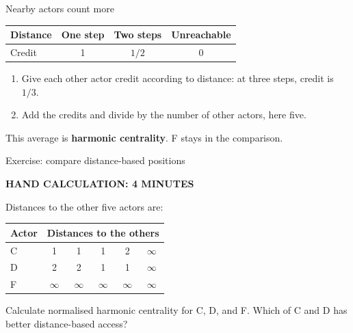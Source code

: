 \documentclass[aspectratio=169,11pt]{beamer}
\newcommand{\activity}[1]{{\small\color{accent}\bfseries #1}\par\medskip}
\begin{document}
\begin{frame}{Nearby actors count more}

\begin{center}
\begin{tabular}{lccc}
\toprule
Distance & One step & Two steps & Unreachable\\\midrule
Credit & 1 & $1/2$ & 0\\\bottomrule
\end{tabular}
\end{center}
\begin{enumerate}
\item Give each other actor credit according to distance: at three steps, credit is $1/3$.
\item Add the credits and divide by the number of other actors, here five.
\end{enumerate}
This average is \textbf{harmonic centrality}. F stays in the comparison.

\end{frame}

\begin{frame}{Exercise: compare distance-based positions}

\activity{HAND CALCULATION: 4 MINUTES}

Distances to the other five actors are:
\begin{center}\begin{tabular}{lccccc}
\toprule
Actor & \multicolumn{5}{c}{Distances to the others}\\\midrule
C & 1 & 1 & 1 & 2 & $\infty$\\
D & 2 & 2 & 1 & 1 & $\infty$\\
F & $\infty$ & $\infty$ & $\infty$ & $\infty$ & $\infty$\\\bottomrule
\end{tabular}\end{center}
Calculate normalised harmonic centrality for C, D, and F.
\medskip
Which of C and D has better distance-based access?


\end{frame}
\end{document}
